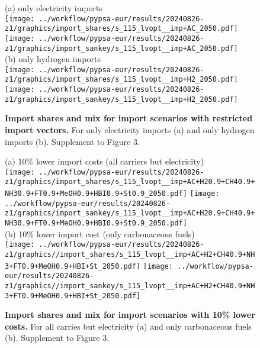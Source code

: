 \begin{figure*}
    \centering
    (a) only electricity imports \\
    \texttt{[image: ../workflow/pypsa-eur/results/20240826-z1/graphics/import\_shares/s\_115\_lvopt\_\_imp+AC\_2050.pdf]}
    \texttt{[image: ../workflow/pypsa-eur/results/20240826-z1/graphics/import\_sankey/s\_115\_lvopt\_\_imp+AC\_2050.pdf]} \\

    (b) only hydrogen imports \\
    \texttt{[image: ../workflow/pypsa-eur/results/20240826-z1/graphics/import\_shares/s\_115\_lvopt\_\_imp+H2\_2050.pdf]}
    \texttt{[image: ../workflow/pypsa-eur/results/20240826-z1/graphics/import\_sankey/s\_115\_lvopt\_\_imp+H2\_2050.pdf]} \\
    \caption{\textbf{Import shares and mix for import scenarios with restricted
    import vectors.} For only electricity imports (a) and only hydrogen imports
    (b). Supplement to Figure 3.}
    \label{fig:si:import-shares-a}
\end{figure*}

\begin{figure*}
    \centering
    (a) 10\% lower import costs (all carriers but electricity) \\
    \texttt{[image: ../workflow/pypsa-eur/results/20240826-z1/graphics/import\_shares/s\_115\_lvopt\_\_imp+AC+H20.9+CH40.9+NH30.9+FT0.9+MeOH0.9+HBI0.9+St0.9\_2050.pdf]}
    \texttt{[image: ../workflow/pypsa-eur/results/20240826-z1/graphics/import\_sankey/s\_115\_lvopt\_\_imp+AC+H20.9+CH40.9+NH30.9+FT0.9+MeOH0.9+HBI0.9+St0.9\_2050.pdf]} \\

    (b) 10\% lower import cost (only carbonaceous fuels) \\
    \texttt{[image: ../workflow/pypsa-eur/results/20240826-z1/graphics//import\_shares/s\_115\_lvopt\_\_imp+AC+H2+CH40.9+NH3+FT0.9+MeOH0.9+HBI+St\_2050.pdf]}
    \texttt{[image: ../workflow/pypsa-eur/results/20240826-z1/graphics//import\_sankey/s\_115\_lvopt\_\_imp+AC+H2+CH40.9+NH3+FT0.9+MeOH0.9+HBI+St\_2050.pdf]} \\
    \caption{\textbf{Import shares and mix for import scenarios with 10\% lower
    costs.} For all carries but electricity (a) and only carbonaceous fuels (b).
    Supplement to Figure 3.}
    \label{fig:si:import-shares-b}
\end{figure*}

